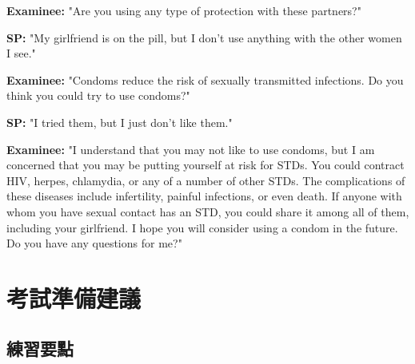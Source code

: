 \documentclass[12pt,a4paper]{article}
\begin{document}
\begin{tcolorbox}[colback=emergency_blue!5!white,colframe=emergency_blue]
\textbf{Examinee:} "Are you using any type of protection with these partners?"

\textbf{SP:} "My girlfriend is on the pill, but I don't use anything with the other women I see."

\textbf{Examinee:} "Condoms reduce the risk of sexually transmitted infections. Do you think you could try to use condoms?"

\textbf{SP:} "I tried them, but I just don't like them."

\textbf{Examinee:} "I understand that you may not like to use condoms, but I am concerned that you may be putting yourself at risk for STDs. You could contract HIV, herpes, chlamydia, or any of a number of other STDs. The complications of these diseases include infertility, painful infections, or even death. If anyone with whom you have sexual contact has an STD, you could share it among all of them, including your girlfriend. I hope you will consider using a condom in the future. Do you have any questions for me?"
\end{tcolorbox}

\section{考試準備建議}

\subsection{練習要點}
\end{document}
